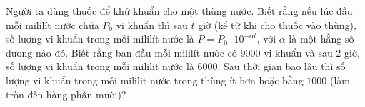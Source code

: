 \begin{ex}%
	Người ta dùng thuốc để khử khuẩn cho một thùng nước. Biết rằng nếu lúc đầu mỗi mililít nước chứa $P_{0}$ vi khuẩn thì sau $t$ giờ (kể từ khi cho thuốc vào thùng), số lượng vi khuẩn trong mỗi mililít nước là $P=P_0 \cdot 10^{-\alpha t}$, với $\alpha$ là một hằng số dương nào đó. Biết rằng ban đầu mỗi mililít nước có $9000$ vi khuẩn và sau $2$ giờ, số lượng vi khuẩn trong mỗi mililit nước là $6000$. Sau thời gian bao lâu thì số lượng vi khuẩn trong  mỗi mililit nước trong thùng ít hơn hoặc bằng $1000$ (làm tròn đến hàng phần mười)?
\end{ex}

